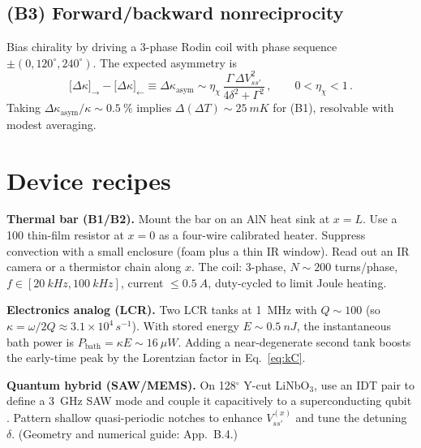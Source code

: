 \documentclass[aps,prb,preprint,amsmath,amssymb]{revtex4-2} %
\begin{document}
        \subsection*{(B3) Forward/backward nonreciprocity}
            Bias chirality by driving a 3-phase Rodin coil with phase sequence $\pm(0,120^\circ,240^\circ)$. The expected asymmetry is
            \begin{equation}
                \big[\Delta\kappa\big]_{\rightarrow}-\big[\Delta\kappa\big]_{\leftarrow} \equiv \Delta\kappa_\text{asym} \sim \eta_\chi\, \frac{\Gamma\,\Delta V_{ss'}^{2}}{4\delta^2+\Gamma^2}\,,\qquad 0<\eta_\chi<1\,.
            \end{equation}
            Taking $\Delta\kappa_\text{asym}/\kappa\sim\SI{0.5}{\percent}$ implies $\Delta(\Delta T)\sim\SI{25}{mK}$ for (B1), resolvable with modest averaging.

    \section{Device recipes}
        \textbf{Thermal bar (B1/B2).} Mount the bar on an AlN heat sink at $x=L$. Use a \SI{100}{\Omega} thin-film resistor at $x=0$ as a four-wire calibrated heater. Suppress convection with a small enclosure (foam plus a thin IR window). Read out an IR camera or a thermistor chain along $x$. The coil: 3-phase, $N\!\sim\!200$ turns/phase, $f\in[\SI{20}{kHz},\SI{100}{kHz}]$, current $\le\SI{0.5}{A}$, duty-cycled to limit Joule heating.

        \textbf{Electronics analog (LCR).} Two LCR tanks at \SI{1}{MHz} with $Q\!\sim\!100$ (so $\kappa=\omega/2Q\approx3.1\times10^4\,\si{s^{-1}}$). With stored energy $E\!\sim\!\SI{0.5}{nJ}$, the instantaneous bath power is $P_\text{bath}=\kappa E\sim\SI{16}{\mu W}$. Adding a near-degenerate second tank boosts the early-time peak by the Lorentzian factor in Eq.~\eqref{eq:kC}.

        \textbf{Quantum hybrid (SAW/MEMS).} On 128$^\circ$ Y-cut LiNbO$_3$, use an IDT pair to define a \SI{3}{GHz} SAW mode and couple it capacitively to a superconducting qubit \cite{Aspelmeyer2014,Manenti2017}. Pattern shallow quasi-periodic notches to enhance $V^{(x)}_{ss'}$ and tune the detuning $\delta$.
        (Geometry and numerical guide: App.~B.4.)
\end{document}
